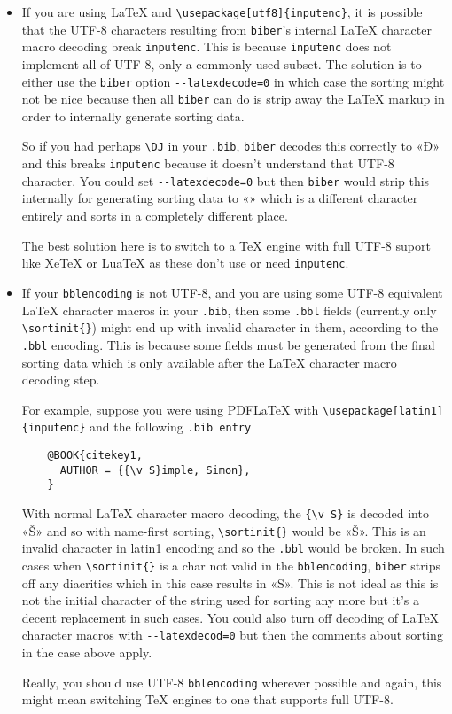 \documentclass{ltxdockit}
\begin{document}
\begin{itemize}
\item If you are using LaTeX and \verb+\usepackage[utf8]{inputenc}+, it is possible
  that the UTF-8 characters resulting from \verb+biber+'s
  internal LaTeX character macro decoding break \verb+inputenc+. This
  is because \verb+inputenc+ does not implement all of UTF-8, only a
  commonly used subset. The solution is to either use the \verb+biber+
  option \verb+--latexdecode=0+ in which case the sorting might not be
  nice because then all \verb+biber+ can do is strip away the LaTeX
  markup in order to internally generate sorting data.

  So if you had perhaps \verb+\DJ+ in your \verb+.bib+,
  \verb+biber+ decodes this correctly to «Đ» and this breaks \verb+inputenc+
  because it doesn't understand that UTF-8 character. You could set
  \verb+--latexdecode=0+ but then \verb+biber+ would strip this
  internally for generating sorting data to «» which is a different
  character entirely and sorts in a completely different place.

  The best solution here is to switch to a TeX engine with full
  UTF-8 suport like XeTeX or LuaTeX as these don't use or need
  \verb+inputenc+.
\item If your \verb+bblencoding+ is not UTF-8, and you are using some
  UTF-8 equivalent LaTeX character macros in your \verb+.bib+, then
  some \verb+.bbl+ fields (currently only \verb+\sortinit{}+) might
  end up with invalid character in them, according to the \verb+.bbl+
  encoding. This is because some fields must be generated from the
  final sorting data which is only available after the LaTeX character
  macro decoding step.

  For example, suppose you were using PDFLaTeX with
  \verb+\usepackage[latin1]{inputenc}+ and the following
  \verb+.bib entry+

  \begin{verbatim}
    @BOOK{citekey1,
      AUTHOR = {{\v S}imple, Simon},
    }
  \end{verbatim}

  \noindent With normal LaTeX character macro decoding, the
  \verb+{\v S}+ is decoded into «Š» and so with name-first sorting,
  \verb+\sortinit{}+ would be «Š». This is an invalid character in
  latin1 encoding and so the \verb+.bbl+ would be broken. In such
  cases when \verb+\sortinit{}+ is a char not valid in the
  \verb+bblencoding+, \verb+biber+ strips off any diacritics which in
  this case results in «S». This is not ideal as this is not the
  initial character of the string used for sorting any more but it's a
  decent replacement in such cases. You could also turn off decoding
  of LaTeX character macros with \verb+--latexdecod=0+ but then the
  comments about sorting in the case above apply.

  Really, you should use UTF-8 \verb+bblencoding+ wherever possible
  and again, this might mean switching TeX engines to one that
  supports full UTF-8.
\end{itemize}
\end{document}

